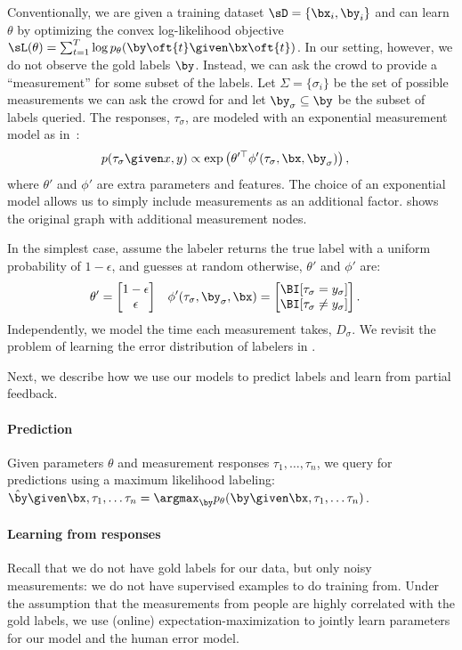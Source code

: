 Conventionally, we are given a training dataset $\sD = \{\bx_i, \by_i\}$ and can learn $\theta$ by optimizing the convex log-likelihood objective $\sL(\theta) = \sum_{t=1}^T \log \p(\by\oft{t} \given \bx\oft{t})$.
In our setting, however, we do not observe the gold labels $\by$. 
Instead, we can ask the crowd to provide a ``measurement'' for some subset of the labels.
Let $\Sigma = \{\sigma_i\}$ be the set of possible measurements we can ask the crowd for and 
let $\by_\sigma \subseteq \by$ be the subset of labels queried.
The responses, $\tau_\sigma$, are modeled with an exponential measurement model as in~\cite{liang09measurements}:
\begin{align*}
  p(\tau_\sigma \given x, y) 
  &\propto \exp \left( \theta'^\top\phi'(\tau_\sigma, \bx, \by_\sigma) \right),
\end{align*}
where $\theta'$ and $\phi'$ are extra parameters and features.
The choice of an exponential model allows us to simply include measurements as an additional factor.
 shows the original graph with additional measurement nodes.

In the simplest case, assume the labeler returns the true label with a uniform probability of $1- \epsilon$, and guesses at random otherwise, $\theta'$ and $\phi'$ are:
\begin{align*}
  \theta' &= 
      \begin{bmatrix}
        1 - \e \\ \e
      \end{bmatrix} &
  \phi'(\tau_\sigma, \by_\sigma, \bx) &=
    \begin{bmatrix}
      \BI[\tau_\sigma = y_\sigma] \\
      \BI[\tau_\sigma \neq y_\sigma]
    \end{bmatrix}.
\end{align*}
Independently, we model the time each measurement takes, $D_\sigma$.
We revisit the problem of learning the error distribution of labelers in .

Next, we describe how we use our models to predict labels and learn from partial feedback.

\paragraph{Prediction}
Given parameters $\theta$ and measurement responses  $\tau_1, \ldots, \tau_n$, we query for predictions using a maximum likelihood labeling:
$\byt \given \bx, \tau_1, \ldots \tau_n = \argmax_{\by} \p(\by \given \bx, \tau_1, \ldots \tau_n)$.

\paragraph{Learning from responses}

Recall that we do not have gold labels for our data, but only noisy measurements: we do not have supervised examples to do training from. 
Under the assumption that the measurements from people are highly correlated with the gold labels, we use (online) expectation-maximization to jointly learn parameters for our model and the human error model.
